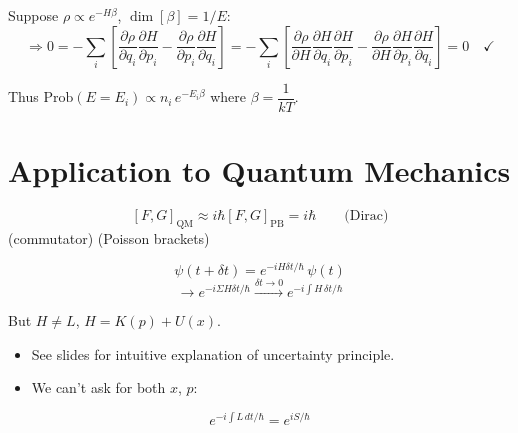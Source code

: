 Suppose $\rho \propto e^{-H\beta}$, $\dim[\beta] = 1/E$:
\[
    \Rightarrow 0 = -\sum_i\!\left[\frac{\partial\rho}{\partial q_i}\frac{\partial H}{\partial p_i} - \frac{\partial\rho}{\partial p_i}\frac{\partial H}{\partial q_i}\right]
    = -\sum_i\!\left[\frac{\partial\rho}{\partial H}\frac{\partial H}{\partial q_i}\frac{\partial H}{\partial p_i} - \frac{\partial\rho}{\partial H}\frac{\partial H}{\partial p_i}\frac{\partial H}{\partial q_i}\right] = 0 \quad \checkmark
\]

Thus $\mathrm{Prob}(E = E_i) \propto n_i\,e^{-E_i\beta}$ where $\beta = \dfrac{1}{kT}$.

\section{Application to Quantum Mechanics}

\[
    [F,G]_\text{QM} \approx i\hbar[F,G]_\text{PB} = i\hbar \qquad \text{(Dirac)}
\]
(commutator) \quad (Poisson brackets)

\[
    \psi(t+\delta t) = e^{-iH\delta t/\hbar}\,\psi(t)
\]
\[
    \to e^{-i\Sigma H\delta t/\hbar} \xrightarrow{\delta t \to 0} e^{-i\int H\,\delta t/\hbar}
\]

But $H \neq L$, $H = K(p) + U(x)$.
\begin{itemize}
    \item See slides for intuitive explanation of uncertainty principle.
    \item We can't ask for both $x$, $p$:
\end{itemize}
\[
    e^{-i\int L\,dt/\hbar} = e^{iS/\hbar}
\]
